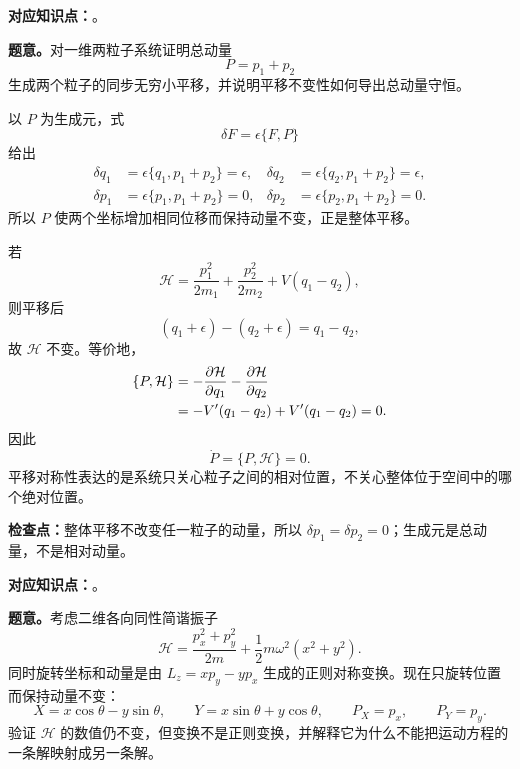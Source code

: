 
\textbf{对应知识点：}。

\textbf{题意。}对一维两粒子系统证明总动量
\[
  P=p_1+p_2
\]
生成两个粒子的同步无穷小平移，并说明平移不变性如何导出总动量守恒。

\begin{checkedsolution}
以 $P$ 为生成元，式
\[
  \delta F=\epsilon\{F,P\}
\]
给出
\begin{align}
  \delta q_1
  &=\epsilon\{q_1,p_1+p_2\}
  =\epsilon,
  &
  \delta q_2
  &=\epsilon\{q_2,p_1+p_2\}
  =\epsilon,
  \label{eq:QM-C02-S08-E01-coordinate-shifts}\\
  \delta p_1
  &=\epsilon\{p_1,p_1+p_2\}=0,
  &
  \delta p_2
  &=\epsilon\{p_2,p_1+p_2\}=0.
  \label{eq:QM-C02-S08-E01-momentum-shifts}
\end{align}
所以 $P$ 使两个坐标增加相同位移而保持动量不变，正是整体平移。

若
\begin{equation}
  \mathcal H
  =\frac{p_1^2}{2m_1}
  +\frac{p_2^2}{2m_2}
  +V(q_1-q_2),
  \label{eq:QM-C02-S08-E01-two-body-hamiltonian}
\end{equation}
则平移后
\[
  (q_1+\epsilon)-(q_2+\epsilon)=q_1-q_2,
\]
故 $\mathcal H$ 不变。等价地，
\begin{align}
  \{P,\mathcal H\}
  &=-\frac{\partial\mathcal H}{\partial q_1}
    -\frac{\partial\mathcal H}{\partial q_2} \notag\\
  &=-V'(q_1-q_2)+V'(q_1-q_2)=0.
  \label{eq:QM-C02-S08-E01-conservation}
\end{align}
因此
\[
  \dot P=\{P,\mathcal H\}=0.
\]
平移对称性表达的是系统只关心粒子之间的相对位置，不关心整体位于空间中的哪个绝对位置。
\end{checkedsolution}

\textbf{检查点：}整体平移不改变任一粒子的动量，所以 $\delta p_1=\delta p_2=0$；生成元是总动量，不是相对动量。


\textbf{对应知识点：}。

\textbf{题意。}考虑二维各向同性简谐振子
\begin{equation}
  \mathcal H
  =\frac{p_x^2+p_y^2}{2m}
  +\frac12m\omega^2(x^2+y^2).
  \label{eq:QM-C02-S08-E02-isotropic-oscillator}
\end{equation}
同时旋转坐标和动量是由 $L_z=xp_y-yp_x$ 生成的正则对称变换。现在只旋转位置而保持动量不变：
\begin{equation}
  X=x\cos\theta-y\sin\theta,
  \qquad
  Y=x\sin\theta+y\cos\theta,
  \qquad
  P_X=p_x,
  \qquad
  P_Y=p_y.
  \label{eq:QM-C02-S08-E02-position-only-rotation}
\end{equation}
验证 $\mathcal H$ 的数值仍不变，但变换不是正则变换，并解释它为什么不能把运动方程的一条解映射成另一条解。

